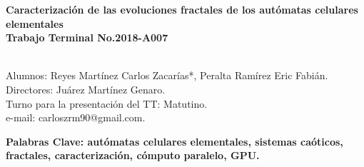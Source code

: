 \documentclass{article}
\begin{document}
    \begin{center}
        \begin{Large}
            \textbf{Caracterización de las evoluciones fractales de los autómatas celulares elementales}
            \\
            
            \textbf{Trabajo Terminal No.2018-A007}
        \end{Large}
        \\{Alumnos: Reyes Martínez Carlos Zacarías*, Peralta Ramírez Eric Fabián.}
        \\{Directores: Juárez Martínez Genaro.}
        \\{Turno para la presentación del TT: Matutino.}
        \\{e-mail: carloszrm90@gmail.com.}
    \end{center}
    
    \begin{abstract}
        \noindent Este trabajo terminal propone una caracterización de los autómatas celulares elementales que producen en su configuración global patrones fractales. Se pretende desarrollar un simulador con el lenguaje de programación Python e implementando programación CUDA, esta caracterización en conjunto con el simulador, describe las reglas mediante un análisis de las historias de evoluciones, las gráficas de los polinomios de la teoría del campo promedio, los campos de atractores y una medida de entropía de los sistemas caóticos basada en la entropía de Shannon. 
    \end{abstract}
    
    \textbf{Palabras Clave: autómatas celulares elementales, sistemas caóticos, fractales, caracterización, cómputo paralelo, GPU.}
    
\end{document}

